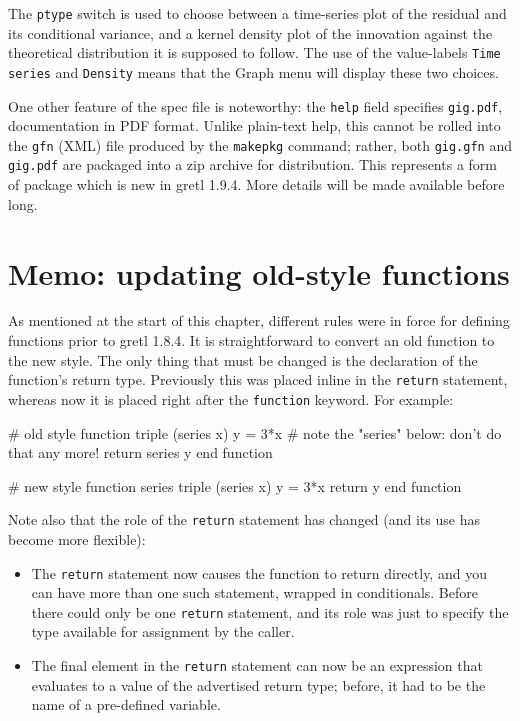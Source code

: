 The \texttt{ptype} switch is used to choose between a time-series plot
of the residual and its conditional variance, and a kernel density
plot of the innovation against the theoretical distribution it is
supposed to follow. The use of the value-labels \texttt{Time series}
and \texttt{Density} means that the \textsf{Graph} menu will display
these two choices.

One other feature of the  spec file is noteworthy: the
\texttt{help} field specifies \texttt{gig.pdf}, documentation in PDF
format. Unlike plain-text help, this cannot be rolled into the
\texttt{gfn} (XML) file produced by the \texttt{makepkg} command;
rather, both \texttt{gig.gfn} and \texttt{gig.pdf} are packaged into a
zip archive for distribution. This represents a form of package
which is new in gretl 1.9.4. More details will be made
available before long. 

\section{Memo: updating old-style functions}
\label{sec:old-func}

As mentioned at the start of this chapter, different rules were in
force for defining functions prior to gretl 1.8.4. It is
straightforward to convert an old function to the new style. The only
thing that must be changed is the declaration of the function's return
type. Previously this was placed inline in the \texttt{return}
statement, whereas now it is placed right after the \texttt{function}
keyword. For example:
%
\begin{code}
# old style
function triple (series x)
  y = 3*x
  # note the "series" below: don't do that any more!
  return series y
end function

# new style
function series triple (series x)
  y = 3*x
  return y
end function
\end{code}

Note also that the role of the \texttt{return} statement has changed
(and its use has become more flexible):

\begin{itemize}
\item The \texttt{return} statement now causes the function to return
  directly, and you can have more than one such statement, wrapped in
  conditionals. Before there could only be one \texttt{return}
  statement, and its role was just to specify the type available for
  assignment by the caller.
\item The final element in the \texttt{return} statement can now be an
  expression that evaluates to a value of the advertised return type;
  before, it had to be the name of a pre-defined variable.
\end{itemize}



